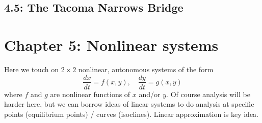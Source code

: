 \documentclass{article}
\begin{document}
\subsection{4.5: The Tacoma Narrows Bridge}



\section{Chapter 5: Nonlinear systems}

Here we touch on $2 \times 2$ nonlinear, autonomous systems of the form
\[
\frac{dx}{dt} = f(x,y), \quad \frac{dy}{dt} = g(x,y) 
\]
where $f$ and $g$ are nonlinear functions of $x$ and/or $y$. Of course analysis will be harder here, but we can borrow ideas of linear systems to do analysis at specific points (equilibrium points) / curves (isoclines). Linear approximation is key idea.

\end{document}
